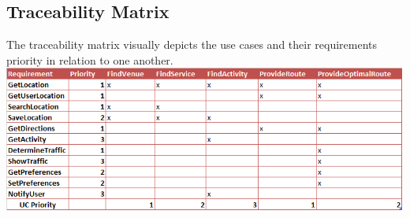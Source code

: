\documentclass[a4paper,12pt]{article}
\begin{document}
\subsection{Traceability Matrix}
The traceability matrix visually depicts the use cases and their requirements priority in relation to one another.\\
\includegraphics[width=\textwidth]{images/trmatrix.png}
\end{document}
